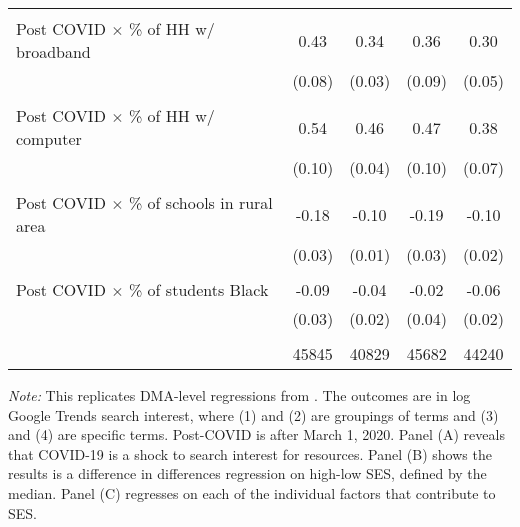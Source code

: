 \begin{table}[htbp]
{\begin{tabular*}{1\textwidth}{@{\extracolsep{\fill}}l*{4}{c}}
                    &                     &                     &                     &                     \\
Post COVID $\times$ \% of HH w/ broadband&        0.43\sym{***}&        0.34\sym{***}&        0.36\sym{***}&        0.30\sym{***}\\
                    &      (0.08)         &      (0.03)         &      (0.09)         &      (0.05)         \\
                    &                     &                     &                     &                     \\
Post COVID $\times$ \% of HH w/ computer&        0.54\sym{***}&        0.46\sym{***}&        0.47\sym{***}&        0.38\sym{***}\\
                    &      (0.10)         &      (0.04)         &      (0.10)         &      (0.07)         \\
                    &                     &                     &                     &                     \\
Post COVID $\times$ \% of schools in rural area&       -0.18\sym{***}&       -0.10\sym{***}&       -0.19\sym{***}&       -0.10\sym{***}\\
                    &      (0.03)         &      (0.01)         &      (0.03)         &      (0.02)         \\
                    &                     &                     &                     &                     \\
Post COVID $\times$ \% of students Black&       -0.09\sym{***}&       -0.04\sym{***}&       -0.02         &       -0.06\sym{***}\\
                    &      (0.03)         &      (0.02)         &      (0.04)         &      (0.02)         \\
                    &                     &                     &                     &                     \\
\hline
& 45845 & 40829 & 45682 & 44240
\end{tabular*}
}
\begin{minipage}{\textwidth}
\footnotesize    \textit{Note:} This replicates DMA-level regressions from \cite{bh1}. The outcomes are in log Google Trends search interest, where (1) and (2) are groupings of terms and (3) and (4) are specific terms. Post-COVID is after March 1, 2020. Panel (A) reveals that COVID-19 is a shock to search interest for resources. Panel (B) shows the results is a difference in differences regression on high-low SES, defined by the median. Panel (C) regresses on each of the individual factors that contribute to SES.
\end{minipage}
\end{table}
